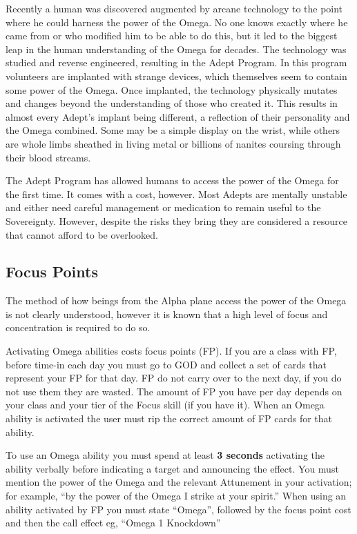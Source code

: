 \documentclass{scrbook}
\begin{document}
Recently a human was discovered augmented by arcane technology to the point where he could harness the power of the Omega. No one knows exactly where he came from or who modified him to be able to do this, but it led to the biggest leap in the human understanding of the Omega for decades. The technology was studied and reverse engineered, resulting in the Adept Program. In this program volunteers are implanted with strange devices, which themselves seem to contain some power of the Omega. Once implanted, the technology physically mutates and changes beyond the understanding of those who created it. This results in almost every Adept's implant being different, a reflection of their personality and the Omega combined. Some may be a simple display on the wrist, while others are whole limbs sheathed in living metal or billions of nanites coursing through their blood streams.

The Adept Program has allowed humans to access the power of the Omega for the first time. It comes with a cost, however. Most Adepts are mentally unstable and either need careful management or medication to remain useful to the Sovereignty. However, despite the risks they bring they are considered a resource that cannot afford to be overlooked.

\subsection{Focus Points}

The method of how beings from the Alpha plane access the power of the Omega is not clearly understood, however it is known that a high level of focus and concentration is required to do so.

Activating Omega abilities costs focus points (FP). If you are a class with FP, before time-in each day you must go to GOD and collect a set of cards that represent your FP for that day. FP do not carry over to the next day, if you do not use them they are wasted. The amount of FP you have per day depends on your class and your tier of the Focus skill (if you have it). When an Omega ability is activated the user must rip the correct amount of FP cards for that ability.

To use an Omega ability you must spend at least \textbf{3 seconds} activating the ability verbally before indicating a target and announcing the effect. You must mention the power of the Omega and the relevant Attunement in your activation; for example, ``by the power of the Omega I strike at your spirit.'' When using an ability activated by FP you must state ``Omega'', followed by the focus point cost and then the call effect eg, ``Omega 1 Knockdown''
\end{document}
